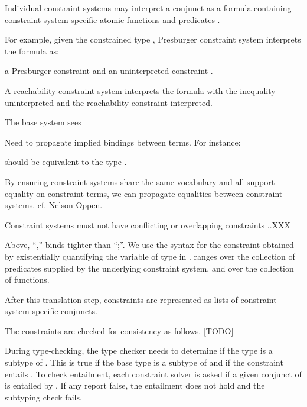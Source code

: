 Individual constraint systems may interpret a conjunct as a
formula containing constraint-system-specific atomic functions
 and predicates .  

For example, given the constrained type
,
Presburger constraint system interprets the formula as:

a Presburger constraint 
and
an uninterpreted constraint .

A reachability constraint system interprets the formula with the
inequality uninterpreted and the reachability constraint
interpreted.

The base system sees  

Need to propagate implied bindings between terms.  For instance:

should be equivalent to the type
.

By ensuring constraint systems share the same vocabulary and all
support equality on constraint terms, we can propagate
equalities between constraint systems.
cf. Nelson-Oppen.

Constraint systems must not have conflicting or overlapping
constraints ..XXX

Above, ``,'' binds tighter than ``;''. We use the syntax  for the constraint obtained by existentially
quantifying the
variable  of type  in .  ranges over
the collection of predicates supplied by the underlying
constraint
system, and  over the collection of functions.




After this translation step, constraints are represented as
lists of constraint-system-specific conjuncts.

The constraints are checked for consistency as follows.
\ref{TODO}
\fi

During type-checking, the type checker needs to determine if the
type
 is a subtype of .  This is true if 
the base type  is a subtype of  and if the
constraint  entails .
%
To check entailment, each constraint solver is asked if
a given conjunct of  is entailed by .
If any report false, the entailment does not hold and the
subtyping check fails.


